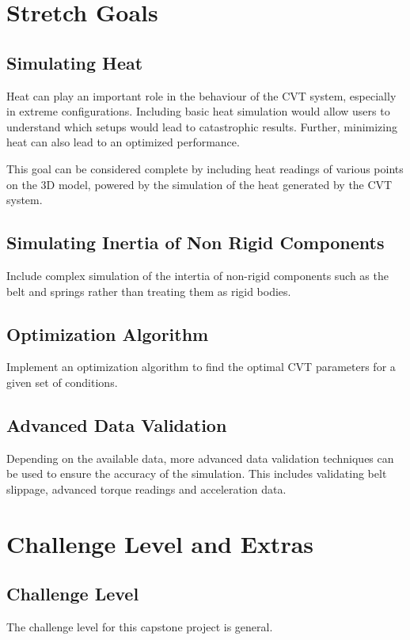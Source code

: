 \documentclass{article}
\begin{document}
\section{Stretch Goals}
\subsection{Simulating Heat}
Heat can play an important role in the behaviour of the CVT system, especially in extreme 
configurations. Including basic heat simulation would allow users to understand which
setups would lead to catastrophic results. Further, minimizing heat can also lead to an optimized
performance.

This goal can be considered complete by including heat readings of various points on the 3D 
model, powered by the simulation of the heat generated by the CVT system.

\subsection{Simulating Inertia of Non Rigid Components}
Include complex simulation of the intertia of non-rigid components such as the belt and 
springs rather than treating them as rigid bodies.

\subsection{Optimization Algorithm}
Implement an optimization algorithm to find the optimal CVT parameters for a given set of 
conditions.

\subsection{Advanced Data Validation}
Depending on the available data, more advanced data validation techniques can be used to 
ensure the accuracy of the simulation. This includes validating belt slippage, advanced torque readings and 
acceleration data.

\section{Challenge Level and Extras}

\subsection{Challenge Level}

The challenge level for this capstone project is general.
\end{document}
